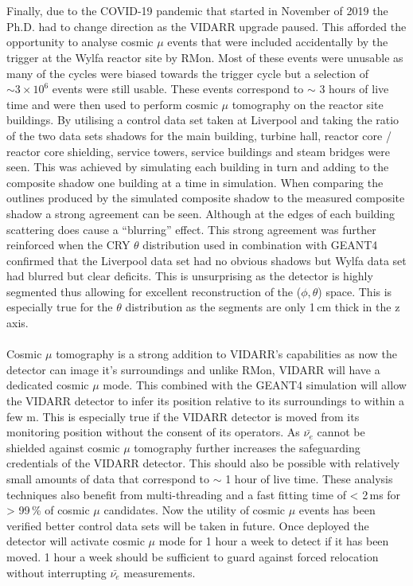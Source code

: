 \\\\Finally, due to the COVID-19 pandemic that started in November of 2019 the Ph.D. had to change direction as the VIDARR upgrade paused. This afforded the opportunity to analyse cosmic $\mu$ events that were included accidentally by the trigger at the Wylfa reactor site by RMon. Most of these events were unusable as many of the cycles were biased towards the trigger cycle but a selection of $\sim 3\times 10^6$ events were still usable. These events correspond to $\sim$ 3 hours of live time and were then used to perform cosmic $\mu$ tomography on the reactor site buildings. By utilising a control data set taken at Liverpool and taking the ratio of the two data sets shadows for the main building, turbine hall, reactor core / reactor core shielding, service towers, service buildings and steam bridges were seen. This was achieved by simulating each building in turn and adding to the composite shadow one building at a time in simulation. When comparing the outlines produced by the simulated composite shadow to the measured composite shadow a strong agreement can be seen. Although at the edges of each building scattering does cause a ``blurring'' effect. This strong agreement was further reinforced when the CRY \cite{ieee_cry_2007} $\theta$ distribution used in combination with GEANT4 confirmed that the Liverpool data set had no obvious shadows but Wylfa data set had blurred but clear deficits. This is unsurprising as the detector is highly segmented thus allowing for excellent reconstruction of the ($\phi,\theta$) space. This is especially true for the $\theta$ distribution as the segments are only 1\,cm thick in the z axis.
\\\\Cosmic $\mu$ tomography is a strong addition to VIDARR's capabilities as now the detector can image it's surroundings and unlike RMon, VIDARR will have a dedicated cosmic $\mu$ mode. This combined with the GEANT4 simulation will allow the VIDARR detector to infer its position relative to its surroundings to within a few m. This is especially true if the VIDARR detector is moved from its monitoring position without the consent of its operators. As $\bar{\nu_e}$ cannot be shielded against cosmic $\mu$ tomography further increases the safeguarding credentials of the VIDARR detector. This should also be possible with relatively small amounts of data that correspond to $\sim$ 1 hour of live time. These analysis techniques also benefit from multi-threading and a fast fitting time of < 2\,ms for > 99\,\% of cosmic $\mu$ candidates. Now the utility of cosmic $\mu$ events has been verified better control data sets will be taken in future. Once deployed the detector will activate cosmic $\mu$ mode for 1 hour a week to detect if it has been moved. 1 hour a week should be sufficient to guard against forced relocation without interrupting $\bar{\nu_e}$ measurements.
